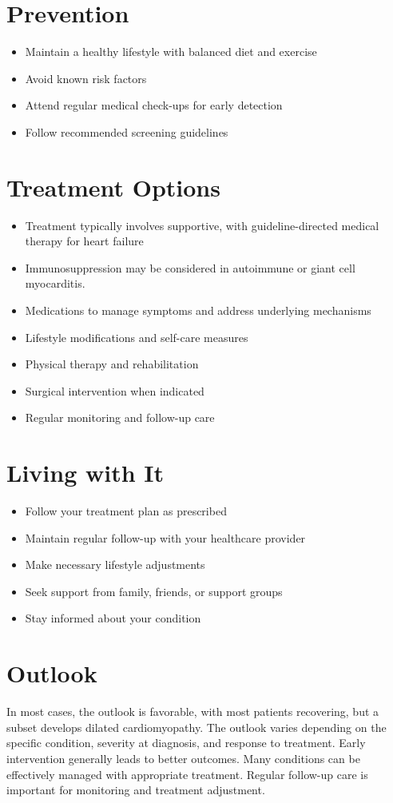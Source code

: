 \section{Prevention}
\begin{itemize}[noitemsep]
  \item Maintain a healthy lifestyle with balanced diet and exercise
  \item Avoid known risk factors
  \item Attend regular medical check-ups for early detection
  \item Follow recommended screening guidelines
\end{itemize}
\section{Treatment Options}
\begin{itemize}[noitemsep]
  \item Treatment typically involves supportive, with guideline-directed medical therapy for heart failure
  \item Immunosuppression may be considered in autoimmune or giant cell myocarditis.
  \item Medications to manage symptoms and address underlying mechanisms
  \item Lifestyle modifications and self-care measures
  \item Physical therapy and rehabilitation
  \item Surgical intervention when indicated
  \item Regular monitoring and follow-up care
\end{itemize}
\section{Living with It}
\begin{itemize}[noitemsep]
  \item Follow your treatment plan as prescribed
  \item Maintain regular follow-up with your healthcare provider
  \item Make necessary lifestyle adjustments
  \item Seek support from family, friends, or support groups
  \item Stay informed about your condition
\end{itemize}
\section{Outlook}
In most cases, the outlook is favorable, with most patients recovering, but a subset develops dilated cardiomyopathy. The outlook varies depending on the specific condition, severity at diagnosis, and response to treatment. Early intervention generally leads to better outcomes. Many conditions can be effectively managed with appropriate treatment. Regular follow-up care is important for monitoring and treatment adjustment.
